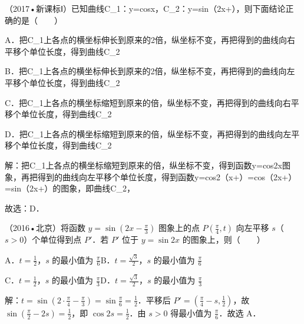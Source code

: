 \begin{question}
（2017•新课标Ⅰ）已知曲线C\_{1}：y=cosx，C\_{2}：y=sin（2x+），则下面结论正确的是（　　）\par
A．把C\_{1}上各点的横坐标伸长到原来的2倍，纵坐标不变，再把得到的曲线向右平移个单位长度，得到曲线C\_{2}\par
B．把C\_{1}上各点的横坐标伸长到原来的2倍，纵坐标不变，再把得到的曲线向左平移个单位长度，得到曲线C\_{2}\par
C．把C\_{1}上各点的横坐标缩短到原来的倍，纵坐标不变，再把得到的曲线向右平移个单位长度，得到曲线C\_{2}\par
D．把C\_{1}上各点的横坐标缩短到原来的倍，纵坐标不变，再把得到的曲线向左平移个单位长度，得到曲线C\_{2}\par
\begin{solution}
解：把C\_{1}上各点的横坐标缩短到原来的倍，纵坐标不变，得到函数y=cos2x图象，再把得到的曲线向左平移个单位长度，得到函数y=cos2（x+）=cos（2x+）=sin（2x+）的图象，即曲线C\_{2}，\par
故选：D．\par
\end{solution}
\end{question}

\begin{question}
（2016•北京）将函数 $y=\sin(2x-\frac{\pi}{3})$ 图象上的点 $P(\frac{\pi}{4},t)$ 向左平移 $s$（$s>0$）个单位得到点 $P'$．若 $P'$ 位于 $y=\sin2x$ 的图象上，则（　　）\par
A．$t=\frac12$，$s$ 的最小值为 $\frac{\pi}{6}$\qquad B．$t=\frac{\sqrt3}{2}$，$s$ 的最小值为 $\frac{\pi}{6}$\par
C．$t=\frac12$，$s$ 的最小值为 $\frac{\pi}{3}$\qquad D．$t=\frac{\sqrt3}{2}$，$s$ 的最小值为 $\frac{\pi}{3}$\par
\begin{solution}
解：$t=\sin(2\cdot\frac{\pi}{4}-\frac{\pi}{3})=\sin\frac{\pi}{6}=\frac12$．平移后 $P'=(\frac{\pi}{4}-s,\frac12)$，故 $\sin(\frac{\pi}{2}-2s)=\frac12$，即 $\cos2s=\frac12$．由 $s>0$ 得最小值为 $\frac{\pi}{6}$．故选 A．\par
\end{solution}
\end{question}

